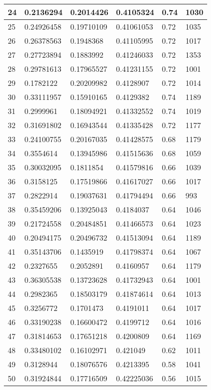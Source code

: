 \begin{longtable}{|l|l|l|l|l|l|}
24 & 0.2136294 & 0.2014426 & 0.4105324 & 0.74 & 1030 \\ \hline 
25 & 0.24926458 & 0.19710109 & 0.41061053 & 0.72 & 1035 \\ \hline 
26 & 0.26378563 & 0.1948368 & 0.41105995 & 0.72 & 1017 \\ \hline 
27 & 0.27723894 & 0.1883992 & 0.41246033 & 0.72 & 1353 \\ \hline 
28 & 0.29781613 & 0.17965527 & 0.41231155 & 0.72 & 1001 \\ \hline 
29 & 0.1782122 & 0.20209982 & 0.4128907 & 0.72 & 1014 \\ \hline 
30 & 0.33111957 & 0.15910165 & 0.4129382 & 0.74 & 1189 \\ \hline 
31 & 0.2999961 & 0.18094921 & 0.41332552 & 0.74 & 1019 \\ \hline 
32 & 0.31691802 & 0.16943544 & 0.41335428 & 0.72 & 1177 \\ \hline 
33 & 0.24100755 & 0.20167035 & 0.41428575 & 0.68 & 1179 \\ \hline 
34 & 0.3554614 & 0.13945986 & 0.41515636 & 0.68 & 1059 \\ \hline 
35 & 0.30032095 & 0.1811854 & 0.41579816 & 0.66 & 1039 \\ \hline 
36 & 0.3158125 & 0.17519866 & 0.41617027 & 0.66 & 1017 \\ \hline 
37 & 0.2822914 & 0.19037631 & 0.41794494 & 0.66 & 993 \\ \hline 
38 & 0.35459206 & 0.13925043 & 0.4184037 & 0.64 & 1046 \\ \hline 
39 & 0.21724558 & 0.20484851 & 0.41466573 & 0.64 & 1023 \\ \hline 
40 & 0.20494175 & 0.20496732 & 0.41513094 & 0.64 & 1189 \\ \hline 
41 & 0.35143706 & 0.1435919 & 0.41798374 & 0.64 & 1067 \\ \hline 
42 & 0.2327655 & 0.2052891 & 0.4160957 & 0.64 & 1179 \\ \hline 
43 & 0.36305538 & 0.13723628 & 0.41732943 & 0.64 & 1001 \\ \hline 
44 & 0.2982365 & 0.18503179 & 0.41874614 & 0.64 & 1013 \\ \hline 
45 & 0.3256772 & 0.1701473 & 0.4191011 & 0.64 & 1017 \\ \hline 
46 & 0.33190238 & 0.16600472 & 0.4199712 & 0.64 & 1016 \\ \hline 
47 & 0.31814653 & 0.17651218 & 0.4200809 & 0.64 & 1169 \\ \hline 
48 & 0.33480102 & 0.16102971 & 0.421049 & 0.62 & 1011 \\ \hline 
49 & 0.3128944 & 0.18076576 & 0.4213395 & 0.58 & 1041 \\ \hline 
50 & 0.31924844 & 0.17716509 & 0.42225036 & 0.56 & 1015 \\ \hline 
\end{longtable}